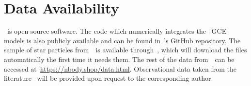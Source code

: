 \documentclass[ms.tex]{subfiles}
\begin{document}
\section{Data Availability}
\vice~is open-source software.
The code which numerically integrates the~\citet{Johnson2021} GCE models is
also publicly available and can be found in~\vice's GitHub repository.
The sample of star particles from~\hsim~is available through~\vice, which will
download the files automatically the first time it needs them.
The rest of the data from~\hsim~can be accessed
at~\url{https://nbody.shop/data.html}.
Observational data taken from the literature~\citep[e.g.][]{Dopita2016,
Schaefer2020, Vincenzo2021} will be provided upon request to the corresponding
author.
\end{document}
